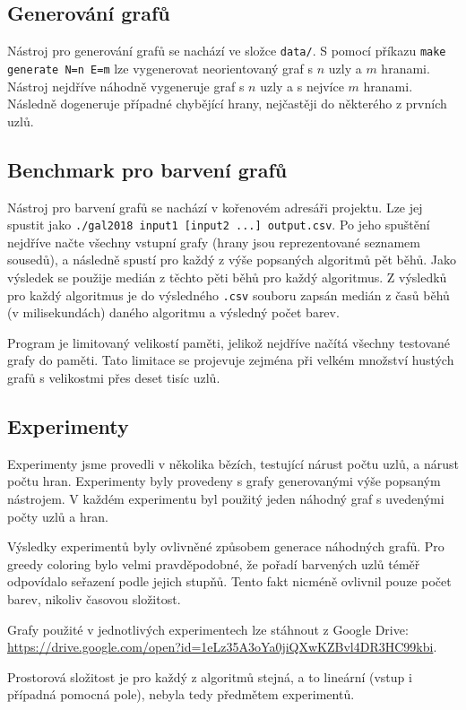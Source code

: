 \documentclass[12pt, a4paper]{article}
\begin{document}
\subsection{Generování grafů}
Nástroj pro generování grafů se nachází ve složce \verb|data/|. S pomocí příkazu \verb|make generate N=n E=m| lze vygenerovat neorientovaný graf s $n$ uzly a $m$ hranami.
Nástroj nejdříve náhodně vygeneruje graf s $n$ uzly a s nejvíce $m$ hranami. Následně dogeneruje případné chybějící hrany, nejčastěji do některého z prvních uzlů.

\subsection{Benchmark pro barvení grafů}
Nástroj pro barvení grafů se nachází v kořenovém adresáři projektu.
Lze jej spustit jako \verb|./gal2018 input1 [input2 ...] output.csv|.
Po jeho spuštění nejdříve načte všechny vstupní grafy (hrany jsou reprezentované seznamem sousedů),
a následně spustí pro každý z výše popsaných algoritmů pět běhů.
Jako výsledek se použije medián z těchto pěti běhů pro každý algoritmus.
Z výsledků pro každý algoritmus je do výsledného \verb|.csv| souboru zapsán medián z časů běhů (v milisekundách) daného algoritmu a výsledný počet barev.

Program je limitovaný velikostí paměti, jelikož nejdříve načítá všechny testované grafy do paměti.
Tato limitace se projevuje zejména při velkém množství hustých grafů s velikostmi přes deset tisíc uzlů.

\subsection{Experimenty}
Experimenty jsme provedli v několika bězích, testující nárust počtu uzlů, a nárust počtu hran.
Experimenty byly provedeny s grafy generovanými výše popsaným nástrojem.
V každém experimentu byl použitý jeden náhodný graf s uvedenými počty uzlů a hran.

Výsledky experimentů byly ovlivněné způsobem generace náhodných grafů. Pro greedy coloring bylo velmi pravděpodobné, že
pořadí barvených uzlů téměř odpovídalo seřazení podle jejich stupňů. Tento fakt nicméně ovlivnil pouze počet barev, nikoliv časovou složitost.

Grafy použité v jednotlivých experimentech lze stáhnout z Google Drive: \url{https://drive.google.com/open?id=1eLz35A3oYa0jiQXwKZBvl4DR3HC99kbi}.

Prostorová složitost je pro každý z algoritmů stejná, a to lineární (vstup i případná pomocná pole), nebyla tedy předmětem experimentů.
\end{document}
